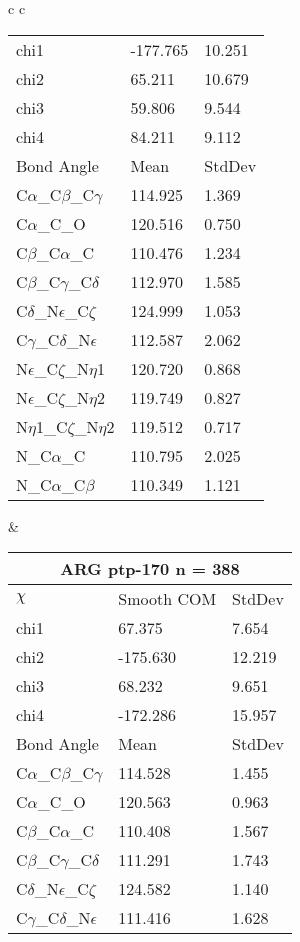 \begin{longtable}{ c c }
\begin{tabular}{ l l l }
  chi1 & -177.765 & 10.251 \\ 
  chi2 & 65.211 & 10.679 \\ 
  chi3 & 59.806 & 9.544 \\ 
  chi4 & 84.211 & 9.112 \\ \midrule
  Bond Angle   & Mean     & StdDev \\ \midrule
  C$\alpha$\_C$\beta$\_C$\gamma$ & 114.925 & 1.369\\
  C$\alpha$\_C\_O & 120.516 & 0.750\\
  C$\beta$\_C$\alpha$\_C & 110.476 & 1.234\\
  C$\beta$\_C$\gamma$\_C$\delta$ & 112.970 & 1.585\\
  C$\delta$\_N$\epsilon$\_C$\zeta$ & 124.999 & 1.053\\
  C$\gamma$\_C$\delta$\_N$\epsilon$ & 112.587 & 2.062\\
  N$\epsilon$\_C$\zeta$\_N$\eta$1 & 120.720 & 0.868\\
  N$\epsilon$\_C$\zeta$\_N$\eta$2 & 119.749 & 0.827\\
  N$\eta$1\_C$\zeta$\_N$\eta$2 & 119.512 & 0.717\\
  N\_C$\alpha$\_C & 110.795 & 2.025\\
  N\_C$\alpha$\_C$\beta$ & 110.349 & 1.121\\
  \bottomrule
  \end{tabular}
  &
  \begin{tabular}{ l l l }
  \toprule
  \multicolumn{3}{c}{ARG \textbf{ptp-170} n = 388} \\ \toprule
  $\chi$       & Smooth COM & StdDev \\ \midrule
  chi1 & 67.375 & 7.654 \\ 
  chi2 & -175.630 & 12.219 \\ 
  chi3 & 68.232 & 9.651 \\ 
  chi4 & -172.286 & 15.957 \\ \midrule
  Bond Angle   & Mean     & StdDev \\ \midrule
  C$\alpha$\_C$\beta$\_C$\gamma$ & 114.528 & 1.455\\
  C$\alpha$\_C\_O & 120.563 & 0.963\\
  C$\beta$\_C$\alpha$\_C & 110.408 & 1.567\\
  C$\beta$\_C$\gamma$\_C$\delta$ & 111.291 & 1.743\\
  C$\delta$\_N$\epsilon$\_C$\zeta$ & 124.582 & 1.140\\
  C$\gamma$\_C$\delta$\_N$\epsilon$ & 111.416 & 1.628\\

\end{tabular}
\end{longtable}
